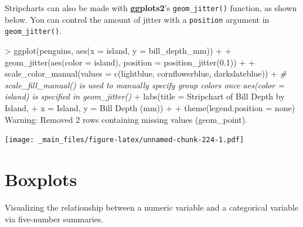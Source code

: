 \documentclass[
]{book}
\newenvironment{Shaded}{\begin{snugshade}}{\end{snugshade}}
\newcommand{\AttributeTok}[1]{\textcolor[rgb]{0.77,0.63,0.00}{#1}}
\newcommand{\CommentTok}[1]{\textcolor[rgb]{0.56,0.35,0.01}{\textit{#1}}}
\newcommand{\DecValTok}[1]{\textcolor[rgb]{0.00,0.00,0.81}{#1}}
\newcommand{\FloatTok}[1]{\textcolor[rgb]{0.00,0.00,0.81}{#1}}
\newcommand{\FunctionTok}[1]{\textcolor[rgb]{0.00,0.00,0.00}{#1}}
\newcommand{\NormalTok}[1]{#1}
\newcommand{\SpecialCharTok}[1]{\textcolor[rgb]{0.00,0.00,0.00}{#1}}
\newcommand{\StringTok}[1]{\textcolor[rgb]{0.31,0.60,0.02}{#1}}
\begin{document}
Stripcharts can also be made with \textbf{ggplots2}'s \texttt{geom\_jitter()} function, as shown below. You can control the amount of jitter with a \texttt{position} argument in \texttt{geom\_jitter()}.

\begin{Shaded}
\begin{Highlighting}[]
\SpecialCharTok{\textgreater{}} \FunctionTok{ggplot}\NormalTok{(penguins, }\FunctionTok{aes}\NormalTok{(}\AttributeTok{x =}\NormalTok{ island, }\AttributeTok{y =}\NormalTok{ bill\_depth\_mm)) }\SpecialCharTok{+}
\SpecialCharTok{+}   \FunctionTok{geom\_jitter}\NormalTok{(}\FunctionTok{aes}\NormalTok{(}\AttributeTok{color =}\NormalTok{ island), }\AttributeTok{position =} \FunctionTok{position\_jitter}\NormalTok{(}\FloatTok{0.1}\NormalTok{)) }\SpecialCharTok{+}
\SpecialCharTok{+}   \FunctionTok{scale\_color\_manual}\NormalTok{(}\AttributeTok{values =} \FunctionTok{c}\NormalTok{(}\StringTok{\textquotesingle{}lightblue\textquotesingle{}}\NormalTok{, }\StringTok{\textquotesingle{}cornflowerblue\textquotesingle{}}\NormalTok{, }\StringTok{\textquotesingle{}darkslateblue\textquotesingle{}}\NormalTok{)) }\SpecialCharTok{+} \CommentTok{\# scale\_fill\_manual() is used to manually specify group colors once aes(color = island) is specified in \textasciigrave{}geom\_jitter()\textasciigrave{}}
\SpecialCharTok{+}   \FunctionTok{labs}\NormalTok{(}\AttributeTok{title =} \StringTok{\textquotesingle{}Stripchart of Bill Depth by Island\textquotesingle{}}\NormalTok{, }
\SpecialCharTok{+}        \AttributeTok{x =} \StringTok{\textquotesingle{}Island\textquotesingle{}}\NormalTok{, }\AttributeTok{y =} \StringTok{\textquotesingle{}Bill Depth (mm)\textquotesingle{}}\NormalTok{) }\SpecialCharTok{+}
\SpecialCharTok{+}   \FunctionTok{theme}\NormalTok{(}\AttributeTok{legend.position =} \StringTok{\textquotesingle{}none\textquotesingle{}}\NormalTok{)}
\NormalTok{Warning}\SpecialCharTok{:}\NormalTok{ Removed }\DecValTok{2}\NormalTok{ rows containing missing }\FunctionTok{values}\NormalTok{ (geom\_point).}
\end{Highlighting}
\end{Shaded}

\texttt{[image: \_main\_files/figure-latex/unnamed-chunk-224-1.pdf]}

\hypertarget{boxplots}{%
\section{Boxplots}\label{boxplots}}

Visualizing the relationship between a numeric variable and a categorical variable via five-number summaries.
\end{document}
